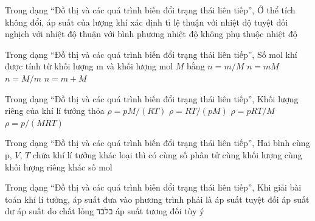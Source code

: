 \begin{ex}
Trong dạng “Đồ thị và các quá trình biến đổi trạng thái liên tiếp”, Ở thể tích không đổi, áp suất của lượng khí xác định tỉ lệ
\choice
{\True thuận với nhiệt độ tuyệt đối}
{nghịch với nhiệt độ}
{thuận với bình phương nhiệt độ}
{không phụ thuộc nhiệt độ}
\end{ex}

\begin{ex}
Trong dạng “Đồ thị và các quá trình biến đổi trạng thái liên tiếp”, Số mol khí được tính từ khối lượng m và khối lượng mol $M$ bằng
\choice
{\True $n=m/M$}
{$n=mM$}
{$n=M/m$}
{$n=m+M$}
\end{ex}

\begin{ex}
Trong dạng “Đồ thị và các quá trình biến đổi trạng thái liên tiếp”, Khối lượng riêng của khí lí tưởng thỏa
\choice
{\True $\rho=pM/(RT)$}
{$\rho=RT/(pM)$}
{$\rho=pRT/M$}
{$\rho=p/(MRT)$}
\end{ex}

\begin{ex}
Trong dạng “Đồ thị và các quá trình biến đổi trạng thái liên tiếp”, Hai bình cùng p, $V$, $T$ chứa khí lí tưởng khác loại thì có
\choice
{\True cùng số phân tử}
{cùng khối lượng}
{cùng khối lượng riêng}
{khác số mol}
\end{ex}

\begin{ex}
Trong dạng “Đồ thị và các quá trình biến đổi trạng thái liên tiếp”, Khi giải bài toán khí lí tưởng, áp suất đưa vào phương trình phải là
\choice
{\True áp suất tuyệt đối}
{áp suất dư}
{áp suất do chất lỏng בלבד}
{áp suất tương đối tùy ý}
\end{ex}
